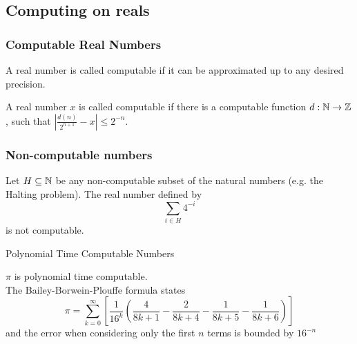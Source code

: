 \subsection{Computing on reals}
\begin{frame}
\frametitle{Computable Real Numbers}
  A real number is called computable if it can be approximated up to any desired precision.
  \vfill
  \pause
\begin{minipage}{.45\textwidth}
		\begin{figure}
		\centering
    \vfill
		\end{figure}
	\end{minipage}
	\hfill
	\begin{minipage}{.45\textwidth}
	\begin{definition}
		A real number $x$ is called computable if there is a computable function $d:\mathbb{N}\to\mathbb{Z}$, such that $ \left|\frac{d(n)}{2^{n+1}} - x\right|\leq 2^{-n}$.   
	\end{definition}
	\end{minipage}
\end{frame}
\begin{frame}
  \frametitle{Non-computable numbers}
  \begin{example}[Specker]
    Let $H \subseteq \mathbb{N}$ be any non-computable subset of the natural numbers (e.g. the Halting problem).
    \pause
    The real number defined by 
    $$
      \sum_{i \in H} 4^{-i}
    $$
    is not computable.
  \end{example}
\end{frame}
\begin{frame}{Polynomial Time Computable Numbers}
  \begin{example}
  $\pi$ is polynomial time computable. \\ \pause
  The Bailey-Borwein-Plouffe formula states
  $$
  \pi = \sum_{k = 0}^{\infty}\left[ \frac{1}{16^k} \left( \frac{4}{8k + 1} - \frac{2}{8k + 4} - \frac{1}{8k + 5} - \frac{1}{8k + 6} \right) \right]
  $$ \pause
  and the error when considering only the first $n$ terms is bounded by $16^{-n}$
  \end{example}
\end{frame}
